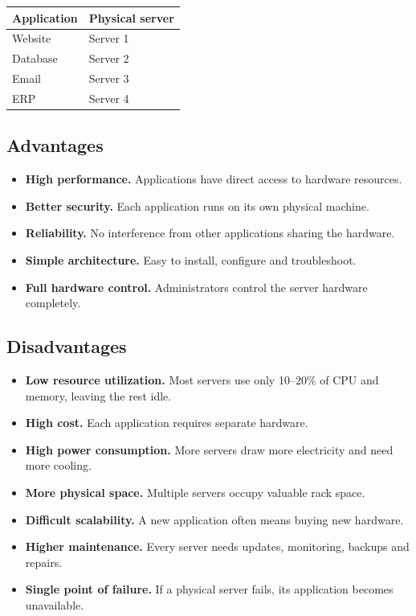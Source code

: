 \documentclass[11pt,a4paper]{article}
\begin{document}

\begin{tabularx}{\textwidth}{@{}lX@{}}
\toprule
\rowcolor{tablehead} \textbf{Application} & \textbf{Physical server} \\
\midrule
Website & Server 1 \\
Database & Server 2 \\
Email & Server 3 \\
ERP & Server 4 \\
\bottomrule
\end{tabularx}

\subsection{Advantages}

\begin{itemize}\itemsep3pt
  \item \textbf{High performance.} Applications have direct access to hardware resources.
  \item \textbf{Better security.} Each application runs on its own physical machine.
  \item \textbf{Reliability.} No interference from other applications sharing the hardware.
  \item \textbf{Simple architecture.} Easy to install, configure and troubleshoot.
  \item \textbf{Full hardware control.} Administrators control the server hardware completely.
\end{itemize}

\subsection{Disadvantages}

\begin{itemize}\itemsep3pt
  \item \textbf{Low resource utilization.} Most servers use only 10--20\% of CPU and memory,
        leaving the rest idle.
  \item \textbf{High cost.} Each application requires separate hardware.
  \item \textbf{High power consumption.} More servers draw more electricity and need more
        cooling.
  \item \textbf{More physical space.} Multiple servers occupy valuable rack space.
  \item \textbf{Difficult scalability.} A new application often means buying new hardware.
  \item \textbf{Higher maintenance.} Every server needs updates, monitoring, backups and
        repairs.
  \item \textbf{Single point of failure.} If a physical server fails, its application becomes
        unavailable.
\end{itemize}
\end{document}
